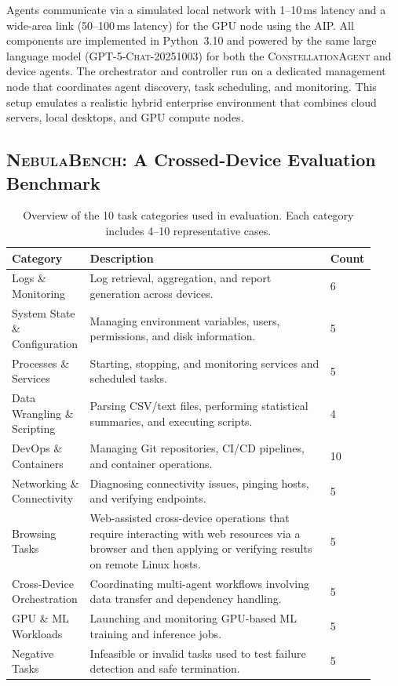 \documentclass[10pt]{article} %
\newcommand{\cagent}{\textsc{ConstellationAgent}\xspace}
\newcommand{\bench}{\textsc{NebulaBench}\xspace}
\begin{document}
Agents communicate via a simulated local network with 1--10\,ms latency and a wide-area link (50--100\,ms latency) for the GPU node using the AIP. All components are implemented in Python~3.10 and powered by the same large language model (\textsc{GPT-5-Chat-20251003}) \cite{openai2025gpt5systemcard} for both the \cagent and device agents. The orchestrator and controller run on a dedicated management node that coordinates agent discovery, task scheduling, and monitoring. This setup emulates a realistic hybrid enterprise environment that combines cloud servers, local desktops, and GPU compute nodes.

\subsection{\bench: A Crossed-Device Evaluation Benchmark}
\label{sec:scenarios}

\begin{table}[t]
\centering
\caption{Overview of the 10 task categories used in evaluation. Each category includes 4--10 representative cases.}
\label{tab:task_categories}
\vspace{3pt}
\begin{tabular}{p{0.21\linewidth} | p{0.65\linewidth} | p{0.06\linewidth} }
\toprule
\textbf{Category} & \textbf{Description} & \textbf{Count} \\ 
\midrule
Logs \& Monitoring & Log retrieval, aggregation, and report generation across devices. & 6 \\\midrule
System State \& Configuration & Managing environment variables, users, permissions, and disk information. & 5 \\\midrule
Processes \& Services & Starting, stopping, and monitoring services and scheduled tasks. & 5  \\\midrule
Data Wrangling \& Scripting & Parsing CSV/text files, performing statistical summaries, and executing scripts. & 4\\  \midrule
DevOps \& Containers & Managing Git repositories, CI/CD pipelines, and container operations. & 10\\\midrule
Networking \& Connectivity & Diagnosing connectivity issues, pinging hosts, and verifying endpoints. & 5\\\midrule
Browsing Tasks & Web-assisted cross-device operations that require interacting with web resources via a browser and then applying or verifying results on remote Linux hosts. & 5\\\midrule
Cross-Device Orchestration & Coordinating multi-agent workflows involving data transfer and dependency handling. & 5\\\midrule
GPU \& ML Workloads & Launching and monitoring GPU-based ML training and inference jobs. & 5\\\midrule
Negative Tasks & Infeasible or invalid tasks used to test failure detection and safe termination. & 5\\\midrule
\bottomrule
\end{tabular}
\end{table}
\end{document}
